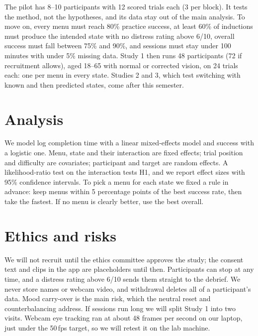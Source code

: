 \documentclass[10pt,a4paper]{article}
\begin{document}
The pilot has 8--10 participants with 12 scored trials each (3 per block). It tests the
method, not the hypotheses, and its data stay out of the main analysis. To move on, every
menu must reach 80\% practice success, at least 60\% of inductions must produce the intended
state with no distress rating above 6/10, overall success must fall between 75\% and 90\%,
and sessions must stay under 100 minutes with under 5\% missing data. Study 1 then runs 48
participants (72 if recruitment allows), aged 18--65 with normal or corrected vision, on 24
trials each: one per menu in every state. Studies 2 and 3, which test switching with known
and then predicted states, come after this semester.

\section{Analysis}

We model log completion time with a linear mixed-effects model and success with a logistic
one. Menu, state and their interaction are fixed effects; trial position and difficulty are
covariates; participant and target are random effects. A likelihood-ratio test on the
interaction tests H1, and we report effect sizes with 95\% confidence intervals. To pick a
menu for each state we fixed a rule in advance: keep menus within 5 percentage points of the
best success rate, then take the fastest. If no menu is clearly better, use the best overall.

\section{Ethics and risks}

We will not recruit until the ethics committee approves the study; the consent text and clips
in the app are placeholders until then. Participants can stop at any time, and a distress
rating above 6/10 sends them straight to the debrief. We never store names or webcam video,
and withdrawal deletes all of a participant's data. Mood carry-over is the main risk, which
the neutral reset and counterbalancing address. If sessions run long we will split Study 1
into two visits. Webcam eye tracking ran at about 48 frames per second on our laptop, just
under the 50\,fps target, so we will retest it on the lab machine.
\end{document}
